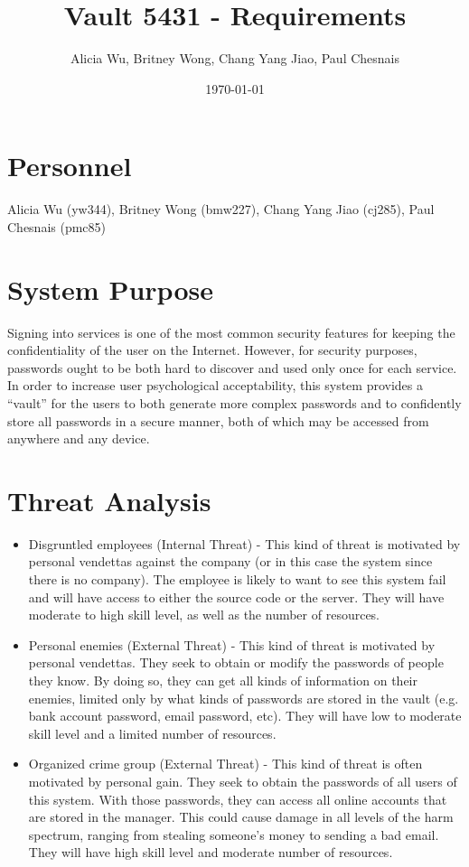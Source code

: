 \documentclass{article}
\title{Vault 5431 - Requirements}
\author{Alicia Wu, Britney Wong, Chang Yang Jiao, Paul Chesnais}
\date{\today}
\begin{document}
\maketitle
\thispagestyle{empty}

\section{Personnel}
\label{sec:personel}
Alicia Wu (yw344), Britney Wong (bmw227), Chang Yang Jiao (cj285), Paul Chesnais (pmc85)

\section{System Purpose}
\label{sec:system_purpose}

Signing into services is one of the most common security features for keeping the confidentiality of the user on the Internet. However, for security purposes, passwords ought to be both hard to discover and used only once for each service. In order to increase user psychological acceptability, this system provides a ``vault'' for the users to both generate more complex passwords and to confidently store all passwords in a secure manner, both of which may be accessed from anywhere and any device.

\section{Threat Analysis}
\label{sec:threat_analysis}

\begin{itemize}
  \item Disgruntled employees (Internal Threat) - This kind of threat is motivated by personal vendettas against the company (or in this case the system since there is no company). The employee is likely to want to see this system fail and will have access to either the source code or the server. They will have moderate to high skill level, as well as the number of resources.
  \item Personal enemies (External Threat) - This kind of threat is motivated by personal vendettas. They seek to obtain or modify the passwords of people they know. By doing so, they can get all kinds of information on their enemies, limited only by what kinds of passwords are stored in the vault (e.g. bank account password, email password, etc). They will have low to moderate skill level and a limited number of resources.
  \item Organized crime group (External Threat) - This kind of threat is often motivated by personal gain. They seek to obtain the passwords of all users of this system. With those passwords, they can access all online accounts that are stored in the manager. This could cause damage in all levels of the harm spectrum, ranging from stealing someone’s money to sending a bad email. They will have high skill level and moderate number of resources.
\end{itemize}
\end{document}
